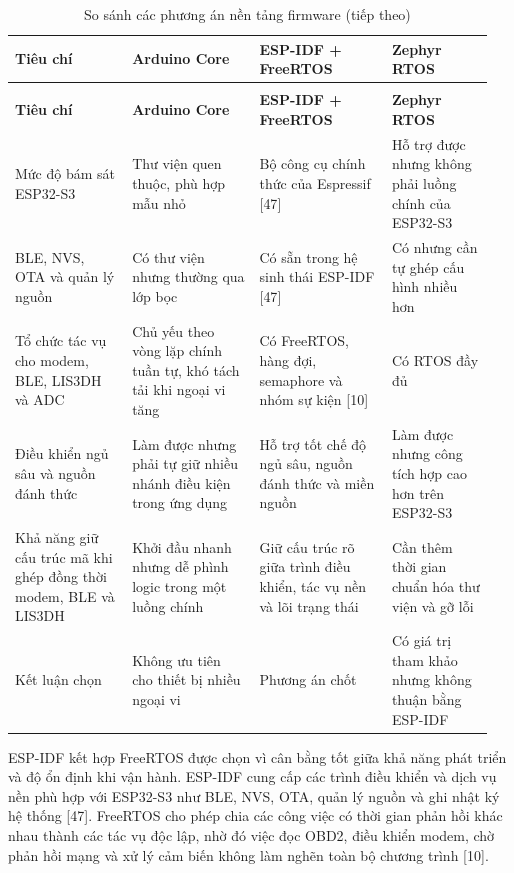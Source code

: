 \documentclass[a4paper]{extarticle}
\newcommand{\thesissettableid}[2]{%
  \renewcommand{\thetable}{#1}%
  \renewcommand{\theHtable}{#2}%
}
\begin{document}
{\thesissettableid{3.14}{condensed-bang-3-14-so-sanh-cac-phuong-an-nen-tang-firmware}
\def\LTcaptype{table}
\begin{longtable}{|L{0.23\linewidth}|L{0.252\linewidth}|L{0.265\linewidth}|L{0.204\linewidth}|}
\caption{So sánh các phương án nền tảng firmware}\label{tab:condensed-bang-3-14-so-sanh-cac-phuong-an-nen-tang-firmware}\\
\hline
\textbf{Tiêu chí} & \textbf{Arduino Core} & \textbf{ESP-IDF + FreeRTOS} & \textbf{Zephyr RTOS} \\
\hline
\endfirsthead
\caption[]{So sánh các phương án nền tảng firmware (tiếp theo)}\\
\hline
\textbf{Tiêu chí} & \textbf{Arduino Core} & \textbf{ESP-IDF + FreeRTOS} & \textbf{Zephyr RTOS} \\
\hline
\endhead
\endfoot
\endlastfoot
Mức độ bám sát ESP32-S3 & Thư viện quen thuộc, phù hợp mẫu nhỏ & Bộ công cụ chính thức của Espressif {[}47{]} & Hỗ trợ được nhưng không phải luồng chính của ESP32-S3 \\\hline
BLE, NVS, OTA và quản lý nguồn & Có thư viện nhưng thường qua lớp bọc & Có sẵn trong hệ sinh thái ESP-IDF {[}47{]} & Có nhưng cần tự ghép cấu hình nhiều hơn \\\hline
Tổ chức tác vụ cho modem, BLE, LIS3DH và ADC & Chủ yếu theo vòng lặp chính tuần tự, khó tách tải khi ngoại vi tăng & Có FreeRTOS, hàng đợi, semaphore và nhóm sự kiện {[}10{]} & Có RTOS đầy đủ \\\hline
Điều khiển ngủ sâu và nguồn đánh thức & Làm được nhưng phải tự giữ nhiều nhánh điều kiện trong ứng dụng & Hỗ trợ tốt chế độ ngủ sâu, nguồn đánh thức và miền nguồn & Làm được nhưng công tích hợp cao hơn trên ESP32-S3 \\\hline
Khả năng giữ cấu trúc mã khi ghép đồng thời modem, BLE và LIS3DH & Khởi đầu nhanh nhưng dễ phình logic trong một luồng chính & Giữ cấu trúc rõ giữa trình điều khiển, tác vụ nền và lõi trạng thái & Cần thêm thời gian chuẩn hóa thư viện và gỡ lỗi \\\hline
Kết luận chọn & Không ưu tiên cho thiết bị nhiều ngoại vi & Phương án chốt & Có giá trị tham khảo nhưng không thuận bằng ESP-IDF \\\hline
\end{longtable}
}

ESP-IDF kết hợp FreeRTOS được chọn vì cân bằng tốt giữa khả năng phát triển và
độ ổn định khi vận hành. ESP-IDF cung cấp các trình điều khiển và dịch vụ nền
phù hợp với ESP32-S3 như BLE, NVS, OTA, quản lý nguồn và ghi nhật ký hệ thống
{[}47{]}. FreeRTOS cho phép chia các công việc có thời gian phản hồi khác nhau thành
các tác vụ độc lập, nhờ đó việc đọc OBD2, điều khiển modem, chờ phản hồi mạng và
xử lý cảm biến không làm nghẽn toàn bộ chương trình {[}10{]}.
\end{document}
